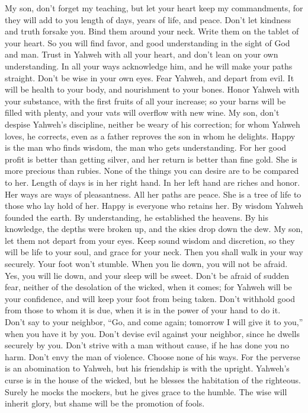  My son, don't forget my teaching, but let your heart keep
my commandments,  for they will add to you length of days,
years of life, and peace.  Don't let kindness and truth
forsake you. Bind them around your neck. Write them on the tablet of
your heart.  So you will find favor, and good
understanding in the sight of God and man.  Trust in
Yahweh with all your heart, and don't lean on your own understanding.
 In all your ways acknowledge him, and he will make your
paths straight.  Don't be wise in your own eyes. Fear
Yahweh, and depart from evil.  It will be health to your
body, and nourishment to your bones.  Honor Yahweh with
your substance, with the first fruits of all your increase;
 so your barns will be filled with plenty, and your vats
will overflow with new wine.  My son, don't despise
Yahweh's discipline, neither be weary of his correction; 
for whom Yahweh loves, he corrects, even as a father reproves the son in
whom he delights.  Happy is the man who finds wisdom, the
man who gets understanding.  For her good profit is
better than getting silver, and her return is better than fine gold.
 She is more precious than rubies. None of the things you
can desire are to be compared to her.  Length of days is
in her right hand. In her left hand are riches and honor.
 Her ways are ways of pleasantness. All her paths are
peace.  She is a tree of life to those who lay hold of
her. Happy is everyone who retains her.  By wisdom Yahweh
founded the earth. By understanding, he established the heavens.
 By his knowledge, the depths were broken up, and the
skies drop down the dew.  My son, let them not depart
from your eyes. Keep sound wisdom and discretion,  so
they will be life to your soul, and grace for your neck. 
Then you shall walk in your way securely. Your foot won't stumble.
 When you lie down, you will not be afraid. Yes, you will
lie down, and your sleep will be sweet.  Don't be afraid
of sudden fear, neither of the desolation of the wicked, when it comes;
 for Yahweh will be your confidence, and will keep your
foot from being taken.  Don't withhold good from those to
whom it is due, when it is in the power of your hand to do it.
 Don't say to your neighbor, ``Go, and come again;
tomorrow I will give it to you,'' when you have it by you.
 Don't devise evil against your neighbor, since he dwells
securely by you.  Don't strive with a man without cause,
if he has done you no harm.  Don't envy the man of
violence. Choose none of his ways.  For the perverse is
an abomination to Yahweh, but his friendship is with the upright.
 Yahweh's curse is in the house of the wicked, but he
blesses the habitation of the righteous.  Surely he mocks
the mockers, but he gives grace to the humble.  The wise
will inherit glory, but shame will be the promotion of fools.

